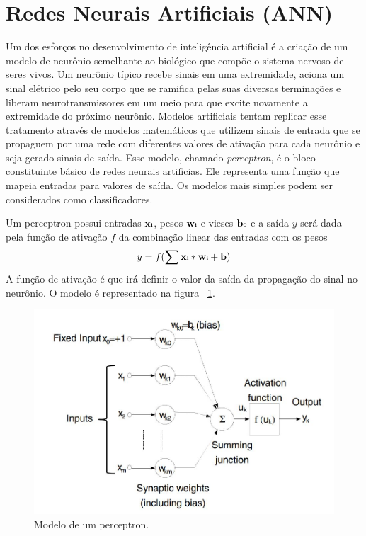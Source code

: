 \documentclass[
	12pt,				%
	oneside,			%
	a4paper,			%
	english,			%
	brazil				%
	]{abntex2}
\begin{document}
	\section{Redes Neurais Artificiais (ANN)}
		
	Um dos esforços no desenvolvimento de inteligência artificial é a criação de um modelo de neurônio semelhante ao biológico que compõe o sistema nervoso de seres vivos. Um neurônio típico recebe sinais em uma extremidade, aciona um sinal elétrico pelo seu corpo que se ramifica pelas suas diversas terminações e liberam neurotransmissores em um meio para que excite novamente a extremidade do próximo neurônio. Modelos artificiais tentam replicar esse tratamento através de modelos matemáticos que utilizem sinais de entrada que se propaguem por uma rede com diferentes valores de ativação para cada neurônio e seja gerado sinais de saída. Esse modelo, chamado \textit{perceptron}, é o bloco constituinte básico de redes neurais artificias. \cite{rosenblatt1958perceptron} Ele representa uma função que mapeia entradas para valores de saída. Os modelos mais simples podem ser considerados como classificadores. 	
	
	Um perceptron possui entradas $\textbf{x{\tiny i}}$, pesos $\textbf{w{\tiny i}}$ e vieses $\textbf{b{\tiny 0}}$ e a saída $y$ será dada pela função de ativação $ f $  da combinação linear das entradas com os pesos $$ y = f (\sum \textbf{x{\tiny i}} * \textbf{w{\tiny i}} +  \textbf{b}) $$
	A função de ativação é que irá definir o valor da saída da propagação do sinal no neurônio. O modelo é representado na figura ~\ref{figura:Perceptron}.
	
\begin{figure}[h]
\centering 
\includegraphics[width=\linewidth]{pictures/Perceptron.JPG} %
\caption{Modelo de um perceptron.}
\label{figura:Perceptron}
\end{figure}
	
\end{document}
